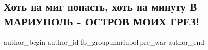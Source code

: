  
 
 
 
 

\subsection{Хоть  на  миг  попасть,  хоть  на  минуту В  МАРИУПОЛЬ  -  ОСТРОВ  МОИХ   ГРЕЗ!}
\label{sec:13_02_2023.fb.fb_group.mariupol.pre_war.6.khot__na__mig__popas}

\ifcmt
 author_begin
   author_id fb_group.mariupol.pre_war
 author_end
\fi
